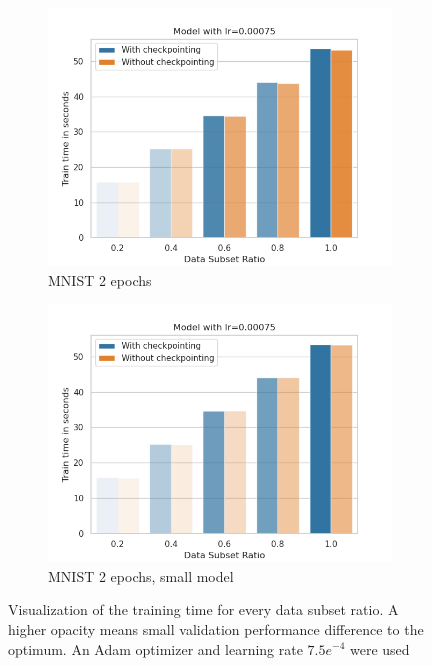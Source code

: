 \begin{figure}[h]
\begin{subfigure}[b]{0.24\textwidth}
        \centering
        \includegraphics[width=\textwidth]{figures/22_07/2ep/train_subset_0.00075.png}
        \caption{MNIST 2 epochs}
        \label{fig:9c}
    \end{subfigure}
    \begin{subfigure}[b]{0.24\textwidth}
        \centering
        \includegraphics[width=\textwidth]{figures/22_07/2ep_smaller/train_subset_0.00075.png}
        \caption{MNIST 2 epochs, small model}
        \label{fig:9d}
    \end{subfigure}
    \caption{Visualization of the training time for every data subset ratio. A higher opacity means small validation performance difference to the optimum. An Adam optimizer and learning rate $7.5e^{-4}$ were used}
    \label{fig:9}
\end{figure}
